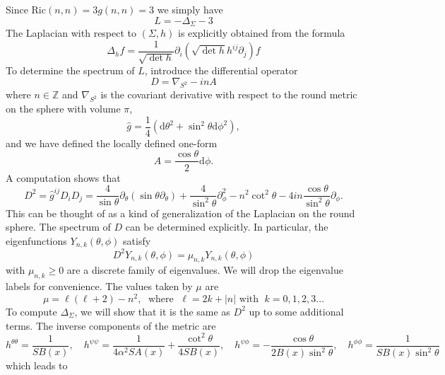 \documentclass[11pt]{amsart}
\theoremstyle{plain}
\newcommand{\td}{\text{d}}
\theoremstyle{definition}
\numberwithin{equation}{section}
\begin{document}
Since $\text{Ric}(n,n) = 3 g(n,n) = 3$ we simply have
\begin{equation}\label{Lpage}
    L = -\Delta_\Sigma -3
\end{equation} The Laplacian with respect to $(\Sigma,h)$ is explicitly obtained from the formula
\begin{equation}
    \Delta_h f = \frac{1}{\sqrt{\det h}} \partial_i (\sqrt{\det h} h^{ij} \partial_j) f
\end{equation} To determine the spectrum of $L$, introduce the differential operator \cite{Wu:1976ge}
\begin{equation}
    D = \nabla_{S^2} - i n A
\end{equation} where $n \in \mathbb{Z}$ and $\nabla_{S^2}$ is the covariant derivative with respect to the round metric on the sphere with volume $\pi$, 
\begin{equation}
    \hat{g} = \frac{1}{4} (\td\theta^2 + \sin^2\theta \td\phi^2),
\end{equation} and we have defined the locally defined one-form
\begin{equation}
    A = \frac{\cos\theta}{2} \td\phi.
\end{equation}
A computation shows that
\begin{equation}
    D^2 = \hat{g}^{ij}D_i D_j = \frac{4}{\sin\theta} \partial_\theta (\sin\theta \partial_\theta) + \frac{4}{\sin^2\theta} \partial_\phi^2 - n^2 \cot^2\theta - 4 i n \frac{\cos\theta}{\sin^2\theta} \partial_\phi.
\end{equation} This can be thought of as a kind of generalization of the Laplacian on the round sphere. The spectrum of $D$ can be determined explicitly. In particular, the eigenfunctions $Y_{n,k}(\theta,\phi)$ satisfy
\begin{equation}
    D^2 Y_{n,k}(\theta, \phi) = \mu_{n,k} Y_{n,k}(\theta, \phi)
\end{equation} with $\mu_{n,k} \geq 0$ are a discrete family of eigenvalues. We will drop the eigenvalue labels for convenience. The values taken by $\mu$ are
\begin{equation}\label{mu}
    \mu = \ell(\ell + 2) - n^2, \; \text{ where }\; \ell = 2k + |n| \text{ with }\; k = 0,1,2,3 \ldots
\end{equation} To compute $\Delta_\Sigma$, we will show that it is the same as $D^2$ up to some additional terms. The inverse components of the metric are
\begin{equation}
    h^{\theta\theta} = \frac{1}{S B(x)}, \quad h^{\psi\psi} = \frac{1}{4\alpha^2 S A(x)} + \frac{\cot^2\theta}{4 S B(x)}, \quad h^{\psi\phi} = -\frac{\cos\theta}{2 B(x) \sin^2\theta}, \quad h^{\phi\phi} = \frac{1}{S B(x) \sin^2\theta}
\end{equation} which leads to 
\end{document}

